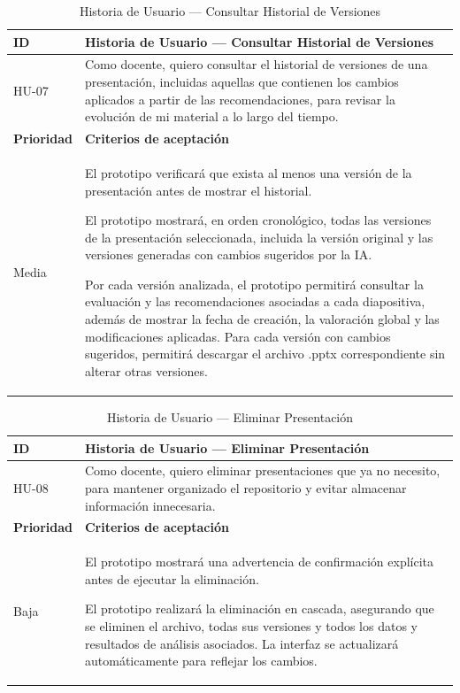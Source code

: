\documentclass[11pt]{article}
\newcommand{\ttstyle}{%
  \small
  \setlength{\tabcolsep}{6pt}%
  \renewcommand{\arraystretch}{1.25}%
  \arrayrulecolor{azulprofundo}%
}
\newcommand{\hairrule}{%
  \arrayrulecolor{azulregla}\midrule[0.3pt]\arrayrulecolor{azulprofundo}%
}
\begin{document}
\begin{table}[H]
    \centering
    \renewcommand{\arraystretch}{1.2}
    \ttstyle
    \begin{tabular}{p{2.5cm}p{11cm}}
        \toprule
        \textbf{ID} & \textbf{Historia de Usuario --- Consultar Historial de Versiones} \\
        \midrule
        HU-07 & Como docente, quiero consultar el historial de versiones de una presentación, incluidas aquellas que contienen los cambios aplicados a partir de las recomendaciones, para revisar la evolución de mi material a lo largo del tiempo. \\
        \hairrule
        \textbf{Prioridad} & \textbf{Criterios de aceptación} \\
        \hairrule
        Media & El prototipo verificará que exista al menos una versión de la presentación antes de mostrar el historial.
        
        El prototipo mostrará, en orden cronológico, todas las versiones de la presentación seleccionada, incluida la versión original y las versiones generadas con cambios sugeridos por la IA.
        
        Por cada versión analizada, el prototipo permitirá consultar la evaluación y las recomendaciones asociadas a cada diapositiva, además de mostrar la fecha de creación, la valoración global y las modificaciones aplicadas. Para cada versión con cambios sugeridos, permitirá descargar el archivo .pptx correspondiente sin alterar otras versiones. \\
        \bottomrule
    \end{tabular}
    \caption{Historia de Usuario — Consultar Historial de Versiones}
    \label{tab:hu-historial-versiones}
\end{table}

\begin{table}[H]
    \centering
    \renewcommand{\arraystretch}{1.2}
    \ttstyle
    \begin{tabular}{p{2.5cm}p{11cm}}
        \toprule
        \textbf{ID} & \textbf{Historia de Usuario --- Eliminar Presentación} \\
        \midrule
        HU-08 & Como docente, quiero eliminar presentaciones que ya no necesito, para mantener organizado el repositorio y evitar almacenar información innecesaria. \\
        \hairrule
        \textbf{Prioridad} & \textbf{Criterios de aceptación} \\
        \hairrule
        Baja & El prototipo mostrará una advertencia de confirmación explícita antes de ejecutar la eliminación. 
        
        El prototipo realizará la eliminación en cascada, asegurando que se eliminen el archivo, todas sus versiones y todos los datos y resultados de análisis asociados. La interfaz se actualizará automáticamente para reflejar los cambios. \\
        \bottomrule
    \end{tabular}
    \caption{Historia de Usuario — Eliminar Presentación}
    \label{tab:hu-eliminar-presentacion}
\end{table}
\end{document}
